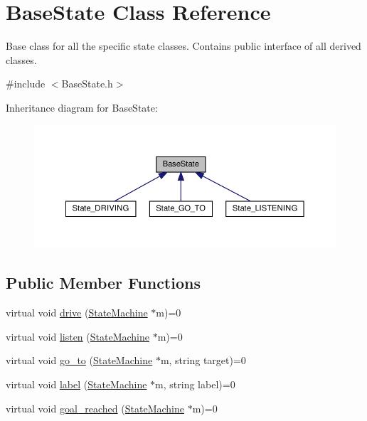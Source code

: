 \hypertarget{class_base_state}{}\section{Base\+State Class Reference}
\label{class_base_state}


Base class for all the specific state classes. Contains public interface of all derived classes.  




{\ttfamily \#include $<$Base\+State.\+h$>$}



Inheritance diagram for Base\+State\+:
\nopagebreak
\begin{figure}[H]
\begin{center}
\leavevmode
\includegraphics[width=350pt]{class_base_state__inherit__graph}
\end{center}
\end{figure}
\subsection*{Public Member Functions}
\begin{DoxyCompactItemize}
\item 
virtual void \hyperlink{class_base_state_a398bc67a0353c3e8da1597dbdbbba2cc}{drive} (\hyperlink{class_state_machine}{State\+Machine} $\ast$m)=0
\item 
virtual void \hyperlink{class_base_state_ac65db46601f60cd025ff058dae117d7c}{listen} (\hyperlink{class_state_machine}{State\+Machine} $\ast$m)=0
\item 
virtual void \hyperlink{class_base_state_a6acb02c9d6b3e54602e163dc1848ac3a}{go\+\_\+to} (\hyperlink{class_state_machine}{State\+Machine} $\ast$m, string target)=0
\item 
virtual void \hyperlink{class_base_state_a9b21ace3d89308945fdecd81b34d3919}{label} (\hyperlink{class_state_machine}{State\+Machine} $\ast$m, string label)=0
\item 
virtual void \hyperlink{class_base_state_aafa71e762d651f1f5a1f7a6decd0d3b5}{goal\+\_\+reached} (\hyperlink{class_state_machine}{State\+Machine} $\ast$m)=0
\end{DoxyCompactItemize}


